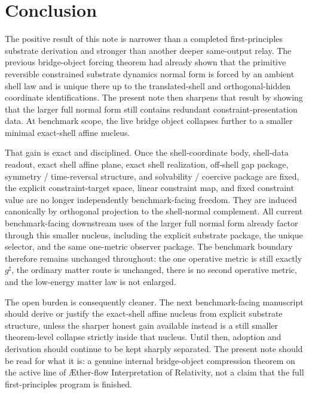 \documentclass[11pt]{article}
\newcommand{\Aflow}{\AE{}ther-flow}
\newcommand{\TheoryName}{\Aflow{} Interpretation of Relativity}
\newcommand{\CompletedMetric}{g^{\sharp}}
\begin{document}
\section{Conclusion}

The positive result of this note is narrower than a completed first-principles substrate derivation and stronger than another deeper same-output relay. The previous bridge-object forcing theorem had already shown that the primitive reversible constrained substrate dynamics normal form is forced by an ambient shell law and is unique there up to the translated-shell and orthogonal-hidden coordinate identifications. The present note then sharpens that result by showing that the larger full normal form still contains redundant constraint-presentation data. At benchmark scope, the live bridge object collapses further to a smaller minimal exact-shell affine nucleus.

That gain is exact and disciplined. Once the shell-coordinate body, shell-data readout, exact shell affine plane, exact shell realization, off-shell gap package, symmetry / time-reversal structure, and solvability / coercive package are fixed, the explicit constraint-target space, linear constraint map, and fixed constraint value are no longer independently benchmark-facing freedom. They are induced canonically by orthogonal projection to the shell-normal complement. All current benchmark-facing downstream uses of the larger full normal form already factor through this smaller nucleus, including the explicit substrate package, the unique selector, and the same one-metric observer package. The benchmark boundary therefore remains unchanged throughout: the one operative metric is still exactly \(\CompletedMetric\), the ordinary matter route is unchanged, there is no second operative metric, and the low-energy matter law is not enlarged.

The open burden is consequently cleaner. The next benchmark-facing manuscript should derive or justify the exact-shell affine nucleus from explicit substrate structure, unless the sharper honest gain available instead is a still smaller theorem-level collapse strictly inside that nucleus. Until then, adoption and derivation should continue to be kept sharply separated. The present note should be read for what it is: a genuine internal bridge-object compression theorem on the active line of \TheoryName{}, not a claim that the full first-principles program is finished.
\end{document}

